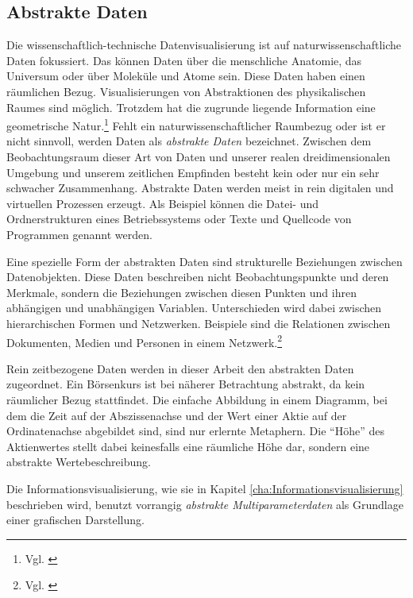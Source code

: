 \documentclass[a4paper, 
               12pt,
               DIV=calc,
               version=first,
               pdftex,
               headsepline,
               footsepline,
               bibliography=totocnumbered,
               listof=numbered]{scrreprt}
\begin{document}
\subsection{Abstrakte Daten}
Die wissenschaftlich-technische Datenvisualisierung ist auf naturwissenschaftliche Daten fokussiert.
Das können Daten über die menschliche Anatomie, das Universum oder über Moleküle und Atome sein. Diese Daten
haben einen räumlichen Bezug. Visualisierungen von Abstraktionen des physikalischen Raumes
sind möglich. Trotzdem hat die zugrunde liegende Information eine geometrische Natur.\footnote{Vgl. \citep[S.\,6]{Card}}
Fehlt ein naturwissenschaftlicher Raumbezug oder ist er nicht sinnvoll, werden Daten als \textit{abstrakte Daten} bezeichnet.
Zwischen dem Beobachtungsraum dieser Art von Daten und unserer realen dreidimensionalen Umgebung und unserem zeitlichen Empfinden
besteht kein oder nur ein sehr schwacher Zusammenhang.
Abstrakte Daten werden meist in rein digitalen und virtuellen Prozessen erzeugt. Als Beispiel
können die Datei- und Ordnerstrukturen eines Betriebssystems oder Texte und Quellcode von Programmen genannt werden.

Eine spezielle Form der abstrakten Daten sind strukturelle Beziehungen zwischen Datenobjekten.
Diese Daten beschreiben nicht Beobachtungspunkte und deren Merkmale, sondern die Beziehungen
zwischen diesen Punkten und ihren abhängigen und unabhängigen Variablen. Unterschieden wird dabei
zwischen hierarchischen Formen und Netzwerken. Beispiele sind die Relationen zwischen Dokumenten,
Medien und Personen in einem Netzwerk.\footnote{Vgl. \citep[S.\,448ff]{Preim}}

Rein zeitbezogene Daten werden in dieser Arbeit den abstrakten Daten zugeordnet. Ein Börsenkurs ist bei näherer Betrachtung
abstrakt, da kein räumlicher Bezug stattfindet.
Die einfache Abbildung in einem Diagramm, bei dem die Zeit auf der Abszissenachse und der Wert einer Aktie auf der Ordinatenachse
abgebildet sind, sind nur erlernte Metaphern. Die "`Höhe"' des Aktienwertes stellt dabei keinesfalls eine räumliche
Höhe dar, sondern eine abstrakte Wertebeschreibung.

Die Informationsvisualisierung, wie sie in Kapitel \ref{cha:Informationsvisualisierung} beschrieben wird, benutzt
vorrangig \textit{abstrakte Multiparameterdaten} als Grundlage einer grafischen Darstellung.
\end{document}
